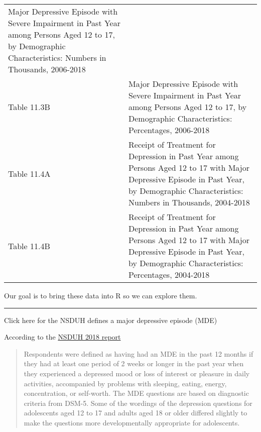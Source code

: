 \documentclass[
]{article}
\begin{document}
\begin{longtable}[]{@{}ll@{}}
\begin{minipage}[t]{0.76\columnwidth}
Major Depressive Episode with Severe Impairment in Past Year among
Persons Aged 12 to 17, by Demographic Characteristics: Numbers in
Thousands, 2006-2018\strut
\end{minipage}\tabularnewline
\begin{minipage}[t]{0.18\columnwidth}\raggedright
Table 11.3B\strut
\end{minipage} & \begin{minipage}[t]{0.76\columnwidth}\raggedright
Major Depressive Episode with Severe Impairment in Past Year among
Persons Aged 12 to 17, by Demographic Characteristics: Percentages,
2006-2018\strut
\end{minipage}\tabularnewline
\begin{minipage}[t]{0.18\columnwidth}\raggedright
Table 11.4A\strut
\end{minipage} & \begin{minipage}[t]{0.76\columnwidth}\raggedright
Receipt of Treatment for Depression in Past Year among Persons Aged 12
to 17 with Major Depressive Episode in Past Year, by Demographic
Characteristics: Numbers in Thousands, 2004-2018\strut
\end{minipage}\tabularnewline
\begin{minipage}[t]{0.18\columnwidth}\raggedright
Table 11.4B\strut
\end{minipage} & \begin{minipage}[t]{0.76\columnwidth}\raggedright
Receipt of Treatment for Depression in Past Year among Persons Aged 12
to 17 with Major Depressive Episode in Past Year, by Demographic
Characteristics: Percentages, 2004-2018\strut
\end{minipage}\tabularnewline
\bottomrule
\end{longtable}

Our goal is to bring these data into R so we can explore them.

\begin{center}\rule{0.5\linewidth}{0.5pt}\end{center}

Click here for the NSDUH defines a major depressive episode (MDE)

According to the
\href{https://www.samhsa.gov/data/sites/default/files/cbhsq-reports/NSDUHNationalFindingsReport2018/NSDUHNationalFindingsReport2018.pdf}{NSDUH
2018 report}

\begin{quote}
Respondents were defined as having had an MDE in the past 12 months if
they had at least one period of 2 weeks or longer in the past year when
they experienced a depressed mood or loss of interest or pleasure in
daily activities, accompanied by problems with sleeping, eating, energy,
concentration, or self-worth. The MDE questions are based on diagnostic
criteria from DSM-5. Some of the wordings of the depression questions
for adolescents aged 12 to 17 and adults aged 18 or older differed
slightly to make the questions more developmentally appropriate for
adolescents.
\end{quote}
\end{document}
